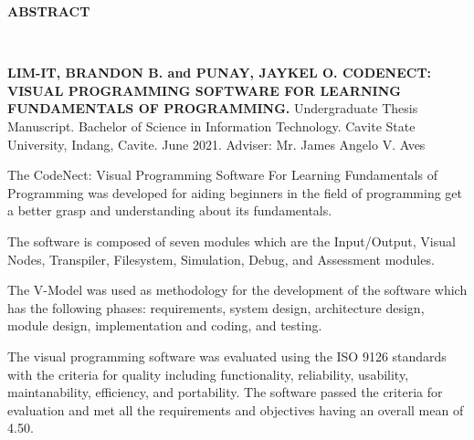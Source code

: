 \begin{doublespace}
	\thispagestyle{empty}

	\begin{center}
		\textbf{ABSTRACT}
	\end{center}
	\leavevmode\\

	\begin{singlespace}
		\parbox{\textwidth}{
		\justify
		\textbf{LIM-IT, BRANDON B. and PUNAY, JAYKEL O. CODENECT: VISUAL
		PROGRAMMING SOFTWARE FOR LEARNING FUNDAMENTALS OF PROGRAMMING.}
		Undergraduate Thesis Manuscript.  Bachelor of Science in Information
		Technology. Cavite State University, Indang, Cavite. June 2021. Adviser: Mr.
		James Angelo V. Aves}
	\end{singlespace}

	\justify
	\hphantom{}

	\parx
	The CodeNect: Visual Programming Software For Learning Fundamentals of
	Programming was developed for aiding beginners in the field of programming
	get a better grasp and understanding about its fundamentals.

	\parx
	The software is composed of seven modules which are the Input/Output, Visual
	Nodes, Transpiler, Filesystem, Simulation, Debug, and Assessment modules.

	\parx
	The V-Model was used as methodology for the development of the software which
	has the following phases: requirements, system design, architecture design, module
	design, implementation and coding, and testing.

	\parx
	The visual programming software was evaluated using the ISO 9126 standards with the
	criteria for quality including functionality, reliability, usability, maintanability,
	efficiency, and portability. The software passed the criteria for evaluation and met
	all the requirements and objectives having an overall mean of 4.50.
\end{doublespace}
